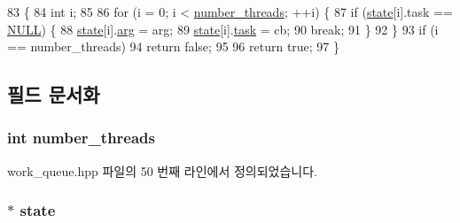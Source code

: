 \begin{DoxyCode}
83 \{
84     \textcolor{keywordtype}{int} i;
85 
86     \textcolor{keywordflow}{for} (i = 0; i < \hyperlink{class_windows_work_queue_a18728b09e371bfac7bd1f64bdcda3de4}{number\_threads}; ++i) \{
87         \textcolor{keywordflow}{if} (\hyperlink{class_windows_work_queue_abf6b506f47e806311cc2a0788607d127}{state}[i].task == \hyperlink{openavb__types__base__pub_8h_a070d2ce7b6bb7e5c05602aa8c308d0c4}{NULL}) \{
88             \hyperlink{class_windows_work_queue_abf6b506f47e806311cc2a0788607d127}{state}[i].\hyperlink{struct_w_w_queue_thread_state_ad688f8fe19987dce997535b44605a118}{arg} = arg;
89             \hyperlink{class_windows_work_queue_abf6b506f47e806311cc2a0788607d127}{state}[i].\hyperlink{struct_w_w_queue_thread_state_a1252d1bbdec76fb559cd091bd145ed91}{task} = cb;
90             \textcolor{keywordflow}{break};
91         \}
92     \}
93     \textcolor{keywordflow}{if} (i == number\_threads)
94         \textcolor{keywordflow}{return} \textcolor{keyword}{false};
95 
96     \textcolor{keywordflow}{return} \textcolor{keyword}{true};
97 \}
\end{DoxyCode}


\subsection{필드 문서화}
\subsubsection[{\texorpdfstring{number\+\_\+threads}{number_threads}}]{\setlength{\rightskip}{0pt plus 5cm}int number\+\_\+threads\hspace{0.3cm}{\ttfamily [private]}}\hypertarget{class_windows_work_queue_a18728b09e371bfac7bd1f64bdcda3de4}{}\label{class_windows_work_queue_a18728b09e371bfac7bd1f64bdcda3de4}


work\+\_\+queue.\+hpp 파일의 50 번째 라인에서 정의되었습니다.

\subsubsection[{\texorpdfstring{state}{state}}]{$\ast$ state\hspace{0.3cm}{\ttfamily [private]}}\hypertarget{class_windows_work_queue_abf6b506f47e806311cc2a0788607d127}{}\label{class_windows_work_queue_abf6b506f47e806311cc2a0788607d127}


